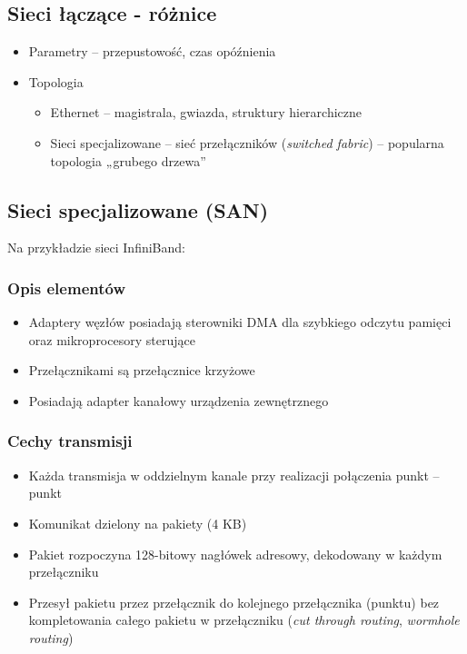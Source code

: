 	\subsection{Sieci łączące - różnice}
		\begin{itemize}
			\item Parametry – przepustowość, czas opóźnienia
			\item Topologia
			\begin{itemize}
				\item Ethernet – magistrala, gwiazda, struktury hierarchiczne
				\item Sieci specjalizowane – sieć przełączników (\textit{switched fabric}) – popularna topologia „grubego drzewa”
			\end{itemize}
		\end{itemize}
	\subsection{Sieci specjalizowane (SAN)}
		Na przykładzie sieci InfiniBand:
		\subsubsection{Opis elementów}
			\begin{itemize}
				\item Adaptery węzłów posiadają sterowniki DMA dla szybkiego odczytu pamięci oraz mikroprocesory sterujące
				\item Przełącznikami są przełącznice krzyżowe
				\item Posiadają adapter kanałowy urządzenia zewnętrznego
			\end{itemize}
		\subsubsection{Cechy transmisji}
			\begin{itemize}
				\item Każda transmisja w oddzielnym kanale przy realizacji połączenia punkt – punkt
				\item Komunikat dzielony na pakiety (4 KB)
				\item Pakiet rozpoczyna 128-bitowy nagłówek adresowy, dekodowany w każdym przełączniku
				\item Przesył pakietu przez przełącznik do kolejnego przełącznika (punktu) bez kompletowania całego pakietu w przełączniku (\emph{cut through routing}, \emph{wormhole routing})
			\end{itemize}
